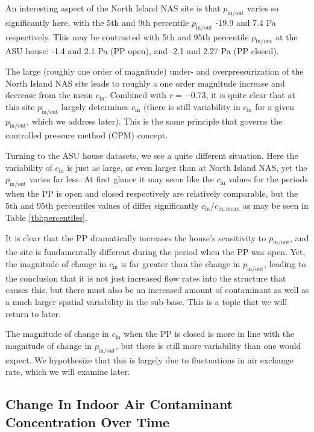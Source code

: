 \documentclass[journal=esthag,manuscript=article]{achemso}
\begin{document}
An interesting aspect of the North Island NAS site is that $p_\mathrm{in/out}$ varies so significantly here, with the 5th and 9th percentile $p_\mathrm{in/out}$ -19.9 and 7.4 Pa respectively.
This may be contrasted with 5th and 95th percentile $p_\mathrm{in/out}$ at the ASU house: -1.4 and 2.1 Pa (PP open), and -2.1 and 2.27 Pa (PP closed).

The large (roughly one order of magnitude) under- and overpressurization of the North Island NAS site leads to roughly a one order magnitude increase and decrease from the mean $c_\mathrm{in}$.
Combined with $r=-0.73$, it is quite clear that at this site $p_\mathrm{in/out}$ largely determines $c_\mathrm{in}$ (there is still variability in $c_\mathrm{in}$ for a given $p_\mathrm{in/out}$, which we address later).
This is the same principle that governs the controlled pressure method (CPM) concept.

Turning to the ASU house datasets, we see a quite different situation.
Here the variability of $c_\mathrm{in}$ is just as large, or even larger than at North Island NAS, yet the $p_\mathrm{in/out}$ varies far less.
At first glance it may seem like the $c_\mathrm{in}$ values for the periods when the PP is open and closed respectively are relatively comparable, but the 5th and 95th percentiles values of differ significantly $c_\mathrm{in}/c_\mathrm{in,mean}$ as may be seen in Table \ref{tbl:percentiles}.

It is clear that the PP dramatically increases the house's sensitivity to $p_\mathrm{in/out}$, and the site is fundamentally different during the period when the PP was open.
Yet, the magnitude of change in $c_\mathrm{in}$ is far greater than the change in $p_\mathrm{in/out}$, leading to the conclusion that it is not just increased flow rates into the structure that causes this, but there must also be an increased amount of contaminant as well as a much larger spatial variability in the sub-base.
This is a topic that we will return to later.

The magnitude of change in $c_\mathrm{in}$ when the PP is closed is more in line with the magnitude of change in $p_\mathrm{in/out}$, but there is still more variability than one would expect.
We hypothesize that this is largely due to fluctuations in air exchange rate, which we will examine later.

\subsection{Change In Indoor Air Contaminant Concentration Over Time} %
\end{document}
